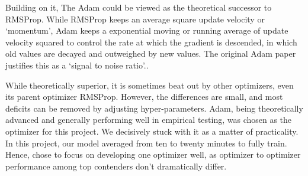 \documentclass[titlepage,letterpaper]{article}
\begin{document}
Building on it, The Adam could be viewed as the theoretical successor to RMSProp. While RMSProp keeps an average square update velocity or `momentum'\cite{rmsprop}, Adam keeps a exponential moving or running average of update velocity squared to control the rate at which the gradient is descended, in which old values are decayed and outweighed by new values. The original Adam paper justifies this as a `signal to noise ratio'.\cite{adam}.




While theoretically superior, it is sometimes beat out by other optimizers, even its parent optimizer RMSProp. However, the differences are small, and most deficits can be removed by adjusting hyper-parameters. Adam, being theoretically advanced and generally performing well in empirical testing, was chosen as the optimizer for this project. We decisively stuck with it as a matter of practicality.\cite{learn} In this project, our model averaged from ten to twenty minutes to fully train. Hence, chose to focus on developing one optimizer well, as optimizer to optimizer performance among top contenders don't dramatically differ.\cite{learn}
\end{document}

